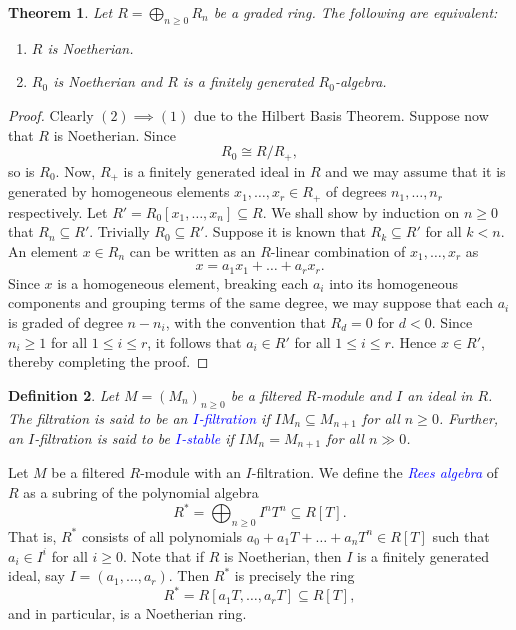 \documentclass[11pt]{article}
\theoremstyle{thmstyle}
\newtheorem{theorem}{Theorem}[section]
\theoremstyle{defstyle}
\newtheorem{definition}[theorem]{Definition}
\newcommand{\define}[1]{\textcolor{blue}{\textit{#1}}}
\renewcommand{\le}{\leqslant}
\renewcommand{\ge}{\geqslant}
\begin{document}
\begin{theorem}
    Let $\displaystyle R = \bigoplus_{n\ge 0} R_n$ be a graded ring. The following are equivalent: 
    \begin{enumerate}[label=(\arabic*)]
        \item $R$ is Noetherian. 
        \item $R_0$ is Noetherian and $R$ is a finitely generated $R_0$-algebra.
    \end{enumerate}
\end{theorem}
\begin{proof}
    Clearly $(2)\implies(1)$ due to the Hilbert Basis Theorem. Suppose now that $R$ is Noetherian. Since 
    \begin{equation*}
        R_0\cong R/R_+,
    \end{equation*}
    so is $R_0$. Now, $R_+$ is a finitely generated ideal in $R$ and we may assume that it is generated by homogeneous elements $x_1,\dots,x_r\in R_+$ of degrees $n_1,\dots,n_r$ respectively. Let $R' = R_0[x_1,\dots,x_n]\subseteq R$. We shall show by induction on $n\ge 0$ that $R_n\subseteq R'$. Trivially $R_0\subseteq R'$. Suppose it is known that $R_k\subseteq R'$ for all $k < n$. An element $x\in R_n$ can be written as an $R$-linear combination of $x_1,\dots,x_r$ as 
    \begin{equation*}
        x = a_1x_1 + \dots + a_r x_r.
    \end{equation*}
    Since $x$ is a homogeneous element, breaking each $a_i$ into its homogeneous components and grouping terms of the same degree, we may suppose that each $a_i$ is graded of degree $n - n_i$, with the convention that $R_d = 0$ for $d < 0$. Since $n_i\ge 1$ for all $1\le i\le r$, it follows that $a_i\in R'$ for all $1\le i\le r$. Hence $x\in R'$, thereby completing the proof.
\end{proof}

\begin{definition}
    Let $M = (M_n)_{n\ge 0}$ be a filtered $R$-module and $I$ an ideal in $R$. The filtration is said to be an \define{$I$-filtration} if $IM_n\subseteq M_{n + 1}$ for all $n\ge 0$. Further, an $I$-filtration is said to be \define{$I$-stable} if $IM_{n} = M_{n + 1}$ for all $n\gg 0$.
\end{definition}

Let $M$ be a filtered $R$-module with an $I$-filtration. We define the \define{Rees algebra} of $R$ as a subring of the polynomial algebra
\begin{equation*}
    R^\ast = \bigoplus_{n\ge 0} I^n T^n\subseteq R[T].
\end{equation*}
That is, $R^\ast$ consists of all polynomials $a_0 + a_1T + \dots + a_nT^n\in R[T]$ such that $a_i\in I^i$ for all $i\ge 0$. Note that if $R$ is Noetherian, then $I$ is a finitely generated ideal, say $I = (a_1,\dots,a_r)$. Then $R^\ast$ is precisely the ring 
\begin{equation*}
    R^\ast = R[a_1T,\dots, a_rT]\subseteq R[T],
\end{equation*}
and in particular, is a Noetherian ring.
\end{document}
